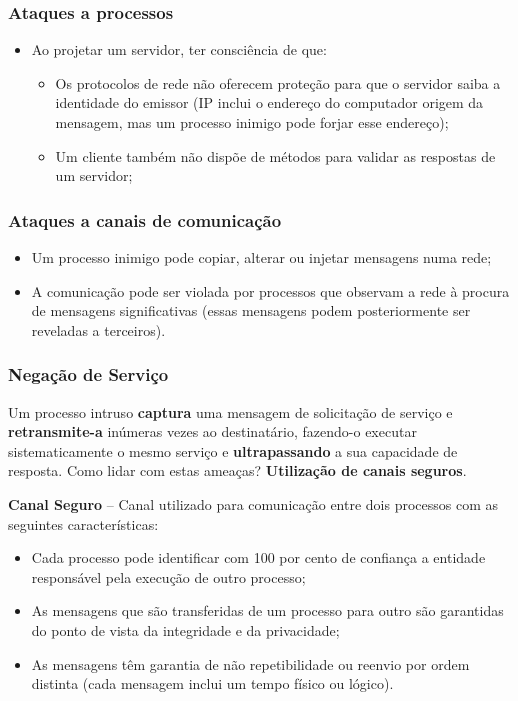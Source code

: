 \documentclass{article}
\begin{document}
\subsubsection{Ataques a processos}

\begin{itemize}
	\item Ao projetar um servidor, ter consciência de que:
	\begin{itemize}
		\item Os protocolos de rede não oferecem proteção para que o servidor saiba a identidade do emissor (IP inclui o endereço do computador origem da mensagem, mas um processo inimigo pode forjar esse endereço);
		\item Um cliente também não dispõe de métodos para validar as respostas de um servidor;
	\end{itemize}
\end{itemize}

\subsubsection{Ataques a canais de comunicação}

\begin{itemize}
	\item Um processo inimigo pode copiar, alterar ou injetar mensagens numa rede;
	\item A comunicação pode ser violada por processos que observam a rede à procura de mensagens significativas (essas mensagens podem posteriormente ser reveladas a terceiros).
\end{itemize}

\subsubsection{Negação de Serviço}

Um processo intruso \textbf{captura} uma mensagem de solicitação de serviço e \textbf{retransmite-a} inúmeras vezes ao destinatário, fazendo-o executar sistematicamente o mesmo serviço e \textbf{ultrapassando} a sua capacidade de resposta. Como lidar com estas ameaças? \textbf{Utilização de canais seguros}.


\textbf{Canal Seguro} -- Canal utilizado para comunicação entre dois processos com as seguintes características:

\begin{itemize}
	\item Cada processo pode identificar com 100 por cento de confiança a entidade responsável pela execução de outro processo;
	\item As mensagens que são transferidas de um processo para outro são garantidas do ponto de vista da integridade e da privacidade;
	\item As mensagens têm garantia de não repetibilidade ou reenvio por ordem distinta (cada mensagem inclui um tempo físico ou lógico).
\end{itemize}
\end{document}
